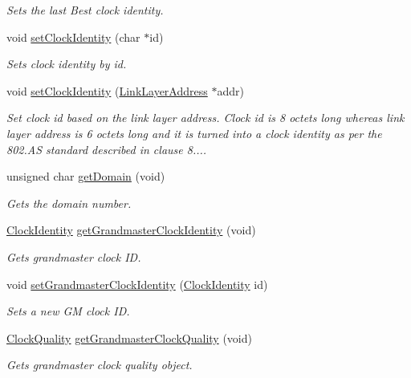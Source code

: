 \begin{DoxyCompactItemize}
\begin{DoxyCompactList}\small\item\em Sets the last Best clock identity. \end{DoxyCompactList}\item 
void \hyperlink{class_i_e_e_e1588_clock_ab6d76a298f1d8c96481124095f2623cc}{set\+Clock\+Identity} (char $\ast$id)
\begin{DoxyCompactList}\small\item\em Sets clock identity by id. \end{DoxyCompactList}\item 
void \hyperlink{class_i_e_e_e1588_clock_abc65386921d3dc63e3c3d6b979e74913}{set\+Clock\+Identity} (\hyperlink{class_link_layer_address}{Link\+Layer\+Address} $\ast$addr)
\begin{DoxyCompactList}\small\item\em Set clock id based on the link layer address. Clock id is 8 octets long whereas link layer address is 6 octets long and it is turned into a clock identity as per the 802.\+AS standard described in clause 8.... \end{DoxyCompactList}\item 
unsigned char \hyperlink{class_i_e_e_e1588_clock_a79e5a79b9ed7781273836177e332a4e8}{get\+Domain} (void)
\begin{DoxyCompactList}\small\item\em Gets the domain number. \end{DoxyCompactList}\item 
\hyperlink{class_clock_identity}{Clock\+Identity} \hyperlink{class_i_e_e_e1588_clock_ac99ffb4b0da93125841bedebf8f4369b}{get\+Grandmaster\+Clock\+Identity} (void)
\begin{DoxyCompactList}\small\item\em Gets grandmaster clock ID. \end{DoxyCompactList}\item 
void \hyperlink{class_i_e_e_e1588_clock_ab6eabbbfe58761a3db3b40721a0bd808}{set\+Grandmaster\+Clock\+Identity} (\hyperlink{class_clock_identity}{Clock\+Identity} id)
\begin{DoxyCompactList}\small\item\em Sets a new GM clock ID. \end{DoxyCompactList}\item 
\hyperlink{struct_clock_quality}{Clock\+Quality} \hyperlink{class_i_e_e_e1588_clock_a20c6f0d95db4f41a665e19a95db71f3b}{get\+Grandmaster\+Clock\+Quality} (void)
\begin{DoxyCompactList}\small\item\em Gets grandmaster clock quality object. \end{DoxyCompactList}\item 

\end{DoxyCompactItemize}
